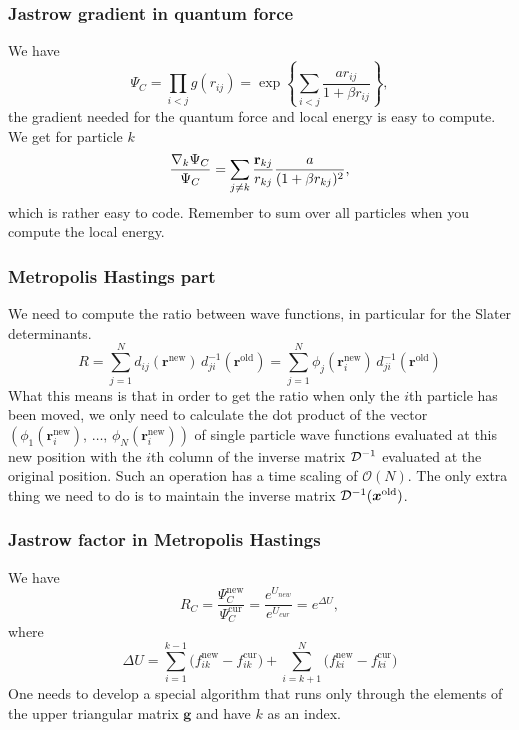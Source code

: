 \documentclass[compress]{beamer}
\newcommand{\matr}[1]{{\bf \cal{#1}}}
\renewcommand{\vec}[1]{\boldsymbol{#1}}
\renewcommand{\det}[1]{|#1|}
\newcommand{\bigO}{\mathcal{O}}
\newcommand{\bfv}[1]{\boldsymbol{#1}}                     %
\begin{document}
\frame
{
  \frametitle{Jastrow gradient in quantum force}
\begin{small}
{\scriptsize
We have
\[
\Psi_C=\prod_{i< j}g(r_{ij})= \exp{\left\{\sum_{i<j}\frac{ar_{ij}}{1+\beta r_{ij}}\right\}},
\]
the gradient needed for the quantum force and local energy is easy to compute.  
We get for particle  $k$
\[
\frac{ \nabla_k \Psi_C}{ \Psi_C }= \sum_{j\ne k}\frac{{\bf r}_{kj}}{r_{kj}}\frac{a}{(1+\beta r_{kj})^2},
\]
which is rather easy to code.  Remember to sum over all particles  when you compute the local energy.
}
\end{small}
}
\frame
{
  \frametitle{Metropolis Hastings part}
\begin{small}
{\scriptsize

We need to compute the ratio between wave functions, in particular  for the Slater determinants.
\[
R =
\sum_{j=1}^N d_{ij}(\mathbf{r}^{\mathrm{new}})\,
d_{ji}^{-1}(\mathbf{r}^{\mathrm{old}}) = 
\sum_{j=1}^N \phi_j(\mathbf{r}_i^{\mathrm{new}})\,
d_{ji}^{-1}(\mathbf{r}^{\mathrm{old}})
\]
What this means is that in order to get the ratio when only the $i$th
particle  has been moved, we only need to calculate the dot
product of the vector $\left(\phi_1(\mathbf{r}_i^\mathrm{new}),\,\dots,\,
\phi_N(\mathbf{r}_i^\mathrm{new})\right)$ of single particle  wave functions
evaluated at this new position with the $i$th column of the inverse
matrix $\matr D^{-1}$ evaluated at the original position. Such
an operation has a time scaling of $\bigO(N)$. The only extra thing we
need to do is to maintain the inverse matrix $\matr D^{-1}(\vec
x^{\mathrm{old}})$.
}
\end{small}
}



\frame
 {
   \frametitle{Jastrow factor in Metropolis Hastings}
 \begin{small}
 {\scriptsize
We have
\begin{equation}
 \boxed{R_{C} = \frac{\Psi_{C}^\mathrm{new}}{\Psi_{C}^\mathrm{cur}} = \frac{e^{U_{new}}}{e^{U_{cur}}} = e^{\Delta U},}
\end{equation}
where
\begin{equation}
\Delta U =
\sum_{i=1}^{k-1}\big(f_{ik}^\mathrm{new}-f_{ik}^\mathrm{cur}\big)
+
\sum_{i=k+1}^{N}\big(f_{ki}^\mathrm{new}-f_{ki}^\mathrm{cur}\big)
\end{equation}
One needs to develop a special algorithm 
that runs only through the elements of the upper triangular
matrix $\bfv{g}$ and have $k$ as an index. 

 }
 \end{small}
 }
\end{document}
